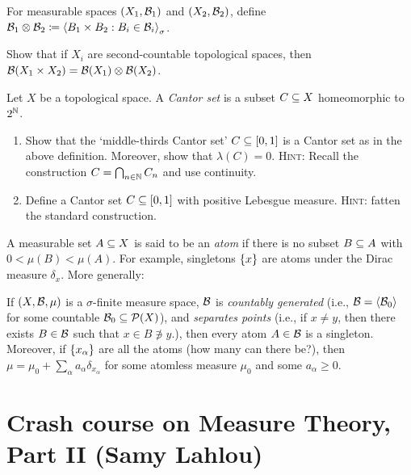 \documentclass[reqno, twoside]{article}
\begin{document}
    For measurable spaces $(X_1,\mathcal{B}_1)$ and $(X_2,\mathcal{B}_2)$, define $\mathcal{B}_1\otimes\mathcal{B}_2\coloneqq\left\langle B_1\times B_2: B_i\in\mathcal{B}_i\right\rangle_\sigma$.

    \begin{exercise}
         Show that if $X_i$ are second-countable topological spaces, then $\mathcal{B}(X_1\times X_2)=\mathcal{B}(X_1)\otimes\mathcal{B}(X_2)$.
     \end{exercise}

    \begin{exercise}
        Let $X$ be a topological space. A \textit{Cantor set} is a subset $C\subseteq X$ homeomorphic to $2^{\mathbb{N}}$.
        \begin{enumerate}
            \item Show that the `middle-thirds Cantor set' $C\subseteq[0,1]$ is a Cantor set as in the above definition. Moreover, show that $\lambda(C)=0$. \textsc{Hint:} Recall the construction $C=\bigcap_{n\in\mathbb{N}}C_n$ and use continuity.
                \vspace{-0.05in}
            \item Define a Cantor set $C\subseteq[0,1]$ with positive Lebesgue measure. \textsc{Hint:} fatten the standard construction.
        \end{enumerate}
    \end{exercise}

    A measurable set $A\subseteq X$ is said to be an \textit{atom} if there is no subset $B\subseteq A$ with $0<\mu(B)<\mu(A)$. For example, singletons $\left\{x\right\}$ are atoms under the Dirac measure $\delta_x$. More generally:

    \begin{exercise}
        If $(X,\mathcal{B},\mu)$ is a $\sigma$-finite measure space, $\mathcal{B}$ is \textit{countably generated} (i.e., $\mathcal{B}=\left\langle\mathcal{B}_0\right\rangle$ for some countable $\mathcal{B}_0\subseteq\mathcal{P}(X)$), and \textit{separates points} (i.e., if $x\neq y$, then there exists $B\in\mathcal{B}$ such that $x\in B\not\ni y$.), then every atom $A\in\mathcal{B}$ is a singleton. Moreover, if $\left\{x_\alpha\right\}$ are all the atoms (how many can there be?), then $\mu=\mu_0+\sum_\alpha a_\alpha\delta_{x_\alpha}$ for some atomless measure $\mu_0$ and some $a_\alpha\geq0$.
    \end{exercise}

    \section{Crash course on Measure Theory, Part II (Samy Lahlou)}\label{sec:2}
\end{document}
